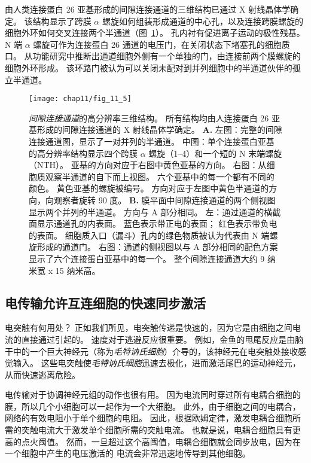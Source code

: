 由人类连接蛋白 26 亚基形成的间隙连接通道的三维结构已通过 X 射线晶体学确定。
该结构显示了跨膜 $\alpha$ 螺旋如何组装形成通道的中心孔，以及连接跨膜螺旋的细胞外环如何交叉连接两个半通道（图~\ref{fig:11_5}）。
孔内衬有促进离子运动的极性残基。
N 端 $\alpha$ 螺旋可作为连接蛋白 26 通道的电压门，在关闭状态下堵塞孔的细胞质口。
从功能研究中推断出通道细胞外侧有一个单独的门，由连接前两个膜螺旋的细胞外环形成。
该环路门被认为可以关闭未配对到并列细胞中的半通道伙伴的孤立半通道。


\begin{figure}[htbp]
	\centering
	\texttt{[image: chap11/fig\_11\_5]}
	\caption{\textit{间隙连接通道}的高分辨率三维结构。
		所有结构均由人连接蛋白 26 亚基形成的间隙连接通道的 X 射线晶体学确定。
		\textbf{A.} 左图：完整的间隙连接通道图，显示了一对并列的半通道。
		中图：单个连接蛋白亚基的高分辨率结构显示四个跨膜 $\alpha$ 螺旋（1–4）和一个短的 N 末端螺旋（NTH）。
		亚基的方向对应于右图中黄色亚基的方向。
		右图：从细胞质观察半通道的自下而上视图。
		六个亚基中的每一个都有不同的颜色。
		黄色亚基的螺旋被编号。
		方向对应于左图中黄色半通道的方向，向观察者旋转 90 度。
		\textbf{B.} 膜平面中间隙连接通道的两个侧视图显示两个并列的半通道。
		方向与 A 部分相同。
		左：通过通道的横截面显示通道孔的内表面。
		蓝色表示带正电的表面；
		红色表示带负电的表面。
		细胞质入口（漏斗）孔内的绿色物质被认为代表由 N 端螺旋形成的通道门。
		右图：通道的侧视图以与 A 部分相同的配色方案显示了六个连接蛋白亚基中的每一个。
		整个间隙连接通道大约 9 纳米宽 x 15 纳米高。}
	\label{fig:11_5}
\end{figure}


\subsection{电传输允许互连细胞的快速同步激活}

电突触有何用处？
正如我们所见，电突触传递是快速的，因为它是由细胞之间电流的直接通过引起的。
速度对于逃避反应很重要。
例如，金鱼的甩尾反应是由脑干中的一个巨大神经元（称为\textit{毛特讷氏细胞}）介导的，该神经元在电突触处接收感觉输入。
这些电突触使\textit{毛特讷氏细胞}迅速去极化，进而激活尾巴的运动神经元，从而快速逃离危险。


电传输对于协调神经元组的动作也很有用。
因为电流同时穿过所有电耦合细胞的膜，所以几个小细胞可以一起作为一个大细胞。
此外，由于细胞之间的电耦合，网络的有效电阻小于单个细胞的电阻。
因此，根据欧姆定律，激发电耦合细胞所需的突触电流大于激发单个细胞所需的突触电流。
也就是说，电耦合细胞具有更高的点火阈值。
然而，一旦超过这个高阈值，电耦合细胞就会同步放电，因为在一个细胞中产生的电压激活的  电流会非常迅速地传导到其他细胞。


